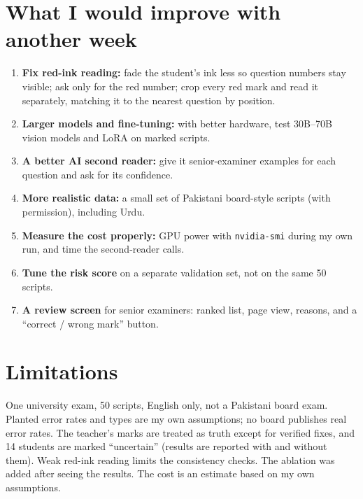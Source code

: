 \section{What I would improve with another week}
\begin{enumerate}
  \item \textbf{Fix red-ink reading:} fade the student's ink less so question numbers stay visible; ask only for the red
        number; crop every red mark and read it separately, matching it to the nearest question by position.
  \item \textbf{Larger models and fine-tuning:} with better hardware, test 30B--70B vision models and LoRA on marked scripts.
  \item \textbf{A better AI second reader:} give it senior-examiner examples for each question and ask for its confidence.
  \item \textbf{More realistic data:} a small set of Pakistani board-style scripts (with permission), including Urdu.
  \item \textbf{Measure the cost properly:} GPU power with \texttt{nvidia-smi} during my own run, and time the second-reader calls.
  \item \textbf{Tune the risk score} on a separate validation set, not on the same 50 scripts.
  \item \textbf{A review screen} for senior examiners: ranked list, page view, reasons, and a ``correct / wrong mark'' button.
\end{enumerate}

\section{Limitations}
One university exam, 50 scripts, English only, not a Pakistani board exam. Planted error rates and types are my own
assumptions; no board publishes real error rates. The teacher's marks are treated as truth except for verified fixes, and
14 students are marked ``uncertain'' (results are reported with and without them). Weak red-ink reading limits the
consistency checks. The ablation was added after seeing the results. The cost is an estimate based on my own assumptions.
